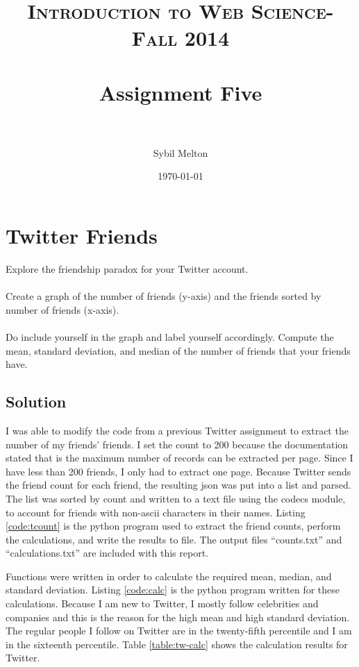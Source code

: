 \documentclass[paper=a4, fontsize=11pt]{scrartcl} %
\title{	
\normalfont \normalsize 
\textsc{Introduction to Web Science- Fall 2014} \\ [25pt] %
\horrule{0.5pt} \\[0.4cm] %
\huge Assignment Five \\ %
\horrule{2pt} \\[0.5cm] %
}
\author{Sybil Melton} %
\date{\normalsize\today} %
\numberwithin{equation}{section} %
\numberwithin{figure}{section} %
\numberwithin{table}{section} %
\begin{document}
\maketitle %
\newpage
\tableofcontents
\listoffigures
\listoftables
\lstlistoflistings
\newpage

\section{Twitter Friends}

Explore the friendship paradox for your Twitter account. 
\\
\\
Create a graph of the number of friends (y-axis) and the friends sorted
by number of friends (x-axis).
\\
\\
Do include yourself in the graph and label yourself accordingly.  Compute
the mean, standard deviation, and median of the number of friends that
your friends have.

\subsection{Solution}

I was able to modify the code from a previous Twitter assignment to extract the number of my friends' friends.  
I set the count to 200 because the documentation stated that is the maximum number of records can be extracted per page.
Since I have less than 200 friends, I only had to extract one page.\cite{bib:tw-friends}
Because Twitter sends the friend count for each friend, the resulting json was put into a list and parsed.  
The list was sorted by count and written to a text file using the codecs module, to account for friends with non-ascii characters in their names.\cite{bib:unicode}
Listing \ref{code:tcount} is the python program used to extract the friend counts, perform the calculations, and write the results to file.
The output files ``counts.txt'' and ``calculations.txt'' are included with this report.

Functions were written in order to calculate the required mean, median, and standard deviation.\cite{bib:stdev}
Listing \ref{code:calc} is the python program written for these calculations.
Because I am new to Twitter, I mostly follow celebrities and companies and this is the reason for the high mean and high standard deviation.
The regular people I follow on Twitter are in the twenty-fifth percentile and I am in the sixteenth percentile.
Table \ref{table:tw-calc} shows the calculation results for Twitter.
\end{document}
